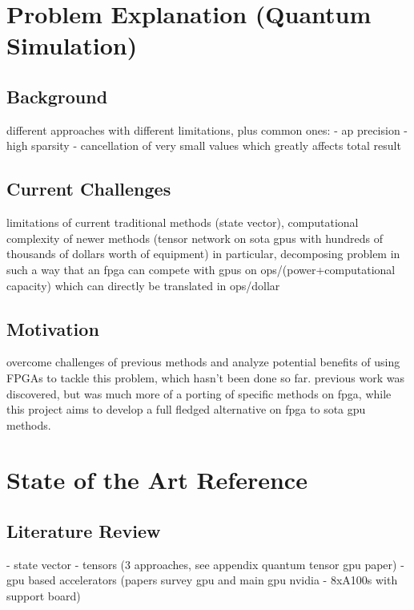 \documentclass[12pt,oneside,a4paper]{article}
\begin{document}
\section{Problem Explanation (Quantum Simulation)} 

\subsection{Background}
different approaches with different limitations, plus common ones:
- ap precision
- high sparsity
- cancellation of very small values which greatly affects total result

\subsection{Current Challenges}
limitations of current traditional methods (state vector), computational complexity of newer methods (tensor network on sota gpus with hundreds of thousands of dollars worth of equipment)
in particular, decomposing problem in such a way that an fpga can compete with gpus on ops/(power+computational capacity) which can directly be translated in ops/dollar

\subsection{Motivation}
overcome challenges of previous methods and analyze potential benefits of using FPGAs to tackle this problem, which hasn't been done so far. previous work was discovered, but was much more of a porting of specific methods on fpga, while this project aims to develop a full fledged alternative on fpga to sota gpu methods.


\section{State of the Art Reference} 

\subsection{Literature Review}
- state vector
- tensors (3 approaches, see appendix quantum tensor gpu paper)
- gpu based accelerators (papers survey gpu and main gpu nvidia - 8xA100s with support board)
\end{document}
